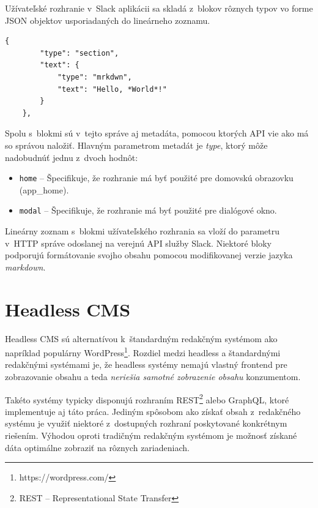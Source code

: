 Užívateľské rozhranie v~Slack aplikácii sa skladá z~blokov rôznych typov vo forme JSON objektov usporiadaných do lineárneho zoznamu. \\

\begin{lstlisting}[caption=Príklad jednoduchého bloku v~Slack aplikácii.]
	{
		"type": "section",
		"text": {
			"type": "mrkdwn",
			"text": "Hello, *World*!"
		}
	},
\end{lstlisting}

\medskip

\noindent Spolu s~blokmi sú v~tejto správe aj metadáta, pomocou ktorých API vie ako má so správou naložiť. Hlavným parametrom metadát je \emph{type}, ktorý môže nadobudnúť jednu z~dvoch hodnôt:

\begin{itemize}
	\item \texttt{home} -- Špecifikuje, že rozhranie má byť použité pre domovskú obrazovku (app\_home).
	\item \texttt{modal} -- Špecifikuje, že rozhranie má byť použité pre dialógové okno.
\end{itemize}

\noindent Lineárny zoznam s~blokmi užívateľského rozhrania sa vloží do parametru  v~HTTP správe odoslanej na verejnú API služby Slack. Niektoré bloky podporujú formátovanie svojho obsahu pomocou modifikovanej verzie jazyka \emph{markdown}.

\chapter{Headless CMS}
\label{theory:headless}
Headless CMS sú alternatívou k~štandardným redakčným systémom ako napríklad populárny WordPress\footnote{https://wordpress.com/}. Rozdiel medzi headless a štandardnými redakčnými systémami je, že headless systémy nemajú vlastný frontend pre zobrazovanie obsahu a teda \emph{neriešia samotné zobrazenie obsahu} konzumentom.

Takéto systémy typicky disponujú rozhraním REST\footnote{REST -- Representational State Transfer} alebo GraphQL, ktoré implementuje aj táto práca. Jediným spôsobom ako získať obsah z~redakčného systému je využiť niektoré z~dostupných rozhraní poskytované konkrétnym riešením. Výhodou oproti tradičným redakčným systémom je možnosť získané dáta optimálne zobraziť na rôznych zariadeniach. 

